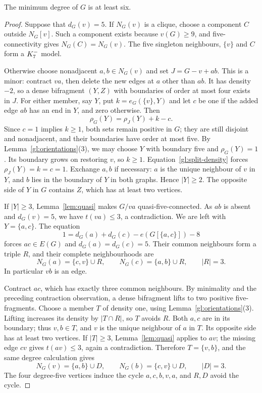 \begin{lemma}\label{gl:degree-six}
The minimum degree of $G$ is at least six.
\end{lemma}

\begin{proof}
Suppose that $d_G(v)=5$. If $N_G(v)$ is a clique, choose a component
$C$ outside $N_G[v]$. Such a component exists because $v(G)\geq9$,
and five-connectivity gives $N_G(C)=N_G(v)$. The five singleton
neighbours, $\{v\}$ and $C$ form a $K_7^{-}$ model.

Otherwise choose nonadjacent $a,b\in N_G(v)$ and set $J=G-v+ab$.
This is a minor: contract $va$, then delete the new edges at $a$
other than $ab$. It has density $-2$, so a dense bifragment $(Y,Z)$
with boundaries of order at most four exists in $J$. For either
member, say $Y$, put $k=e_G(\{v\},Y)$ and let $c$ be one if the
added edge $ab$ has an end in $Y$, and zero otherwise. Then
\begin{equation}\label{gl:split-density}
 \rho_G(Y)=\rho_J(Y)+k-c.
\end{equation}
Since $c=1$ implies $k\geq1$, both sets remain positive in $G$;
they are still disjoint and nonadjacent, and their boundaries have
order at most five. By Lemma~\ref{gl:orientations}(3), we may choose
$Y$ with boundary five and $\rho_G(Y)=1$. Its boundary
grows on restoring $v$, so $k\geq1$. Equation~\eqref{gl:split-density}
forces $\rho_J(Y)=k=c=1$. Exchange $a,b$ if necessary: $a$ is the
unique neighbour of $v$ in $Y$, and $b$ lies in the boundary of $Y$
in both graphs. Hence $|Y|\geq2$. The opposite side of $Y$ in $G$
contains $Z$, which has at least two vertices.

If $|Y|\geq3$, Lemma~\ref{lem:quasi} makes $G/va$
quasi-five-connected. As $ab$ is absent and $d_G(v)=5$, we have
$t(va)\leq3$, a contradiction. We are left with $Y=\{a,c\}$.
The equation
\[
 1=d_G(a)+d_G(c)-e(G[\{a,c\}])-8
\]
forces $ac\in E(G)$ and $d_G(a)=d_G(c)=5$. Their common neighbours
form a triple $R$, and their complete neighbourhoods are
\begin{equation}\label{gl:first-pair}
 N_G(a)=\{c,v\}\cup R,\qquad
 N_G(c)=\{a,b\}\cup R,\qquad |R|=3.
\end{equation}
In particular $vb$ is an edge.

Contract $ac$, which has exactly three common neighbours. By
minimality and the preceding contraction observation, a dense
bifragment lifts to two positive five-fragments. Choose a member
$T$ of density one, using Lemma~\ref{gl:orientations}(3). Lifting
increases its density by $|T\cap R|$, so $T$ avoids $R$. Both $a,c$
are in its boundary; thus $v,b\in T$, and $v$ is the unique
neighbour of $a$ in $T$. Its opposite side has at least two vertices.
If $|T|\geq3$, Lemma~\ref{lem:quasi} applies to $av$; the missing
edge $cv$ gives $t(av)\leq3$, again a contradiction. Therefore
$T=\{v,b\}$, and the same degree calculation gives
\begin{equation}\label{gl:second-pair}
 N_G(v)=\{a,b\}\cup D,\qquad
 N_G(b)=\{c,v\}\cup D,\qquad |D|=3.
\end{equation}
The four degree-five vertices induce the cycle $a,c,b,v,a$, and
$R,D$ avoid the cycle.


\end{proof}
